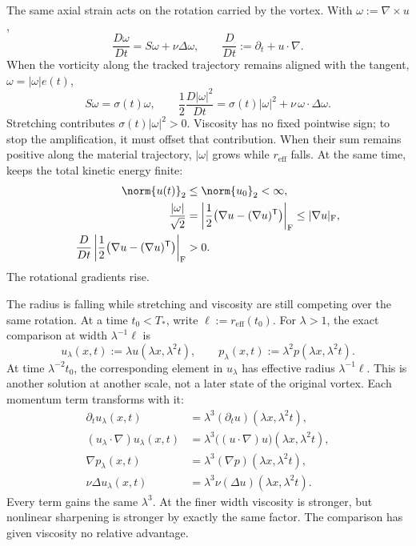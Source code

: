 The same axial strain acts on the rotation carried by the vortex.
With \(\omega:=\nabla\times u\),
\[
  \frac{D\omega}{Dt}
  =
  S\omega+\nu\Delta\omega,
  \qquad
  \frac{D}{Dt}
  :=
  \partial_t+u\cdot\nabla.
\]
When the vorticity along the tracked trajectory remains aligned with the tangent, \(\omega=|\omega|e(t)\),
\[
  S\omega
  =
  \sigma(t)\omega,
  \qquad
  \frac12\frac{D|\omega|^2}{Dt}
  =
  \sigma(t)|\omega|^2
  +
  \nu\,\omega\cdot\Delta\omega.
\]
Stretching contributes \(\sigma(t)|\omega|^2>0\).
Viscosity has no fixed pointwise sign; to stop the amplification, it must offset that contribution.
When their sum remains positive along the material trajectory, \(|\omega|\) grows while \(r_{\mathrm{eff}}\) falls.
At the same time,  keeps the total kinetic energy finite:
\[
\begin{aligned}
  \norm{u(t)}_2
  &\leq
  \norm{u_0}_2
  <
  \infty,
  \\
  \frac{|\omega|}{\sqrt2}
  &=
  \left|\frac12\bigl(\nabla u-(\nabla u)^{\mathsf T}\bigr)\right|_{\mathrm F}
  \leq
  |\nabla u|_{\mathrm F},
  \\
  \frac{D}{Dt}
  \left|\frac12\bigl(\nabla u-(\nabla u)^{\mathsf T}\bigr)\right|_{\mathrm F}
  &>
  0.
\end{aligned}
\]
The rotational gradients rise.


The radius is falling while stretching and viscosity are still competing over the same rotation.
At a time \(t_0<T_*\), write \(\ell:=r_{\mathrm{eff}}(t_0)\).
For \(\lambda>1\), the exact \NavierStokes{} comparison at width \(\lambda^{-1}\ell\) is
\[
  u_\lambda(x,t)
  :=
  \lambda u(\lambda x,\lambda^2t),
  \qquad
  p_\lambda(x,t)
  :=
  \lambda^2p(\lambda x,\lambda^2t).
\]
At time \(\lambda^{-2}t_0\), the corresponding element in \(u_\lambda\) has effective radius \(\lambda^{-1}\ell\).
This is another solution at another scale, not a later state of the original vortex.
Each momentum term transforms with it:
\[
\begin{aligned}
  \partial_tu_\lambda(x,t)
  &=
  \lambda^3(\partial_tu)(\lambda x,\lambda^2t),
  \\
  (u_\lambda\cdot\nabla)u_\lambda(x,t)
  &=
  \lambda^3\bigl((u\cdot\nabla)u\bigr)(\lambda x,\lambda^2t),
  \\
  \nabla p_\lambda(x,t)
  &=
  \lambda^3(\nabla p)(\lambda x,\lambda^2t),
  \\
  \nu\Delta u_\lambda(x,t)
  &=
  \lambda^3\nu(\Delta u)(\lambda x,\lambda^2t).
\end{aligned}
\]
Every term gains the same \(\lambda^3\).
At the finer width viscosity is stronger, but nonlinear sharpening is stronger by exactly the same factor.
The comparison has given viscosity no relative advantage.


